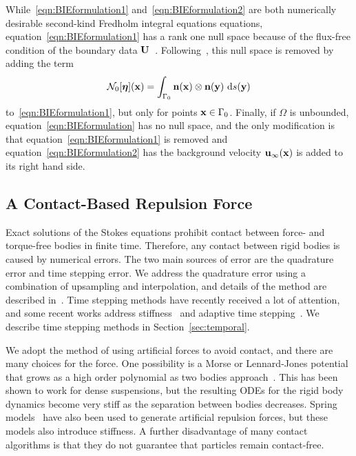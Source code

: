 \documentclass[preprint, 10pt]{elsarticle}
\begin{document}
While~\eqref{eqn:BIEformulation1} and~\eqref{eqn:BIEformulation2} are
both numerically desirable second-kind Fredholm integral equations
equations, equation~\eqref{eqn:BIEformulation1} has a rank one null
space because of the flux-free condition of the boundary data
${\mathbf{U}}$~\cite{Ladyzhenskaya1963}.  Following~\cite{Power1993}, this null
space is removed by adding the term 
\begin{align}
\label{eqn:N0_modification} 
  \mathcal{N}_0[{\boldsymbol\eta}]({\mathbf{x}}) = \int_{\Gamma_0} 
    {\mathbf{n}}({\mathbf{x}})\otimes{\mathbf{n}}({\mathbf{y}})~\text{d}s({\mathbf{y}})
\end{align}
to~\eqref{eqn:BIEformulation1}, but only for points ${\mathbf{x}} \in \Gamma_0$.
Finally, if $\Omega$ is unbounded, equation~\eqref{eqn:BIEformulation}
has no null space, and the only modification is that
equation~\eqref{eqn:BIEformulation1} is removed and
equation~\eqref{eqn:BIEformulation2} has the background velocity
${\mathbf{u}}_\infty({\mathbf{x}})$ is added to its right hand side.

\subsection{A Contact-Based Repulsion Force}
\label{sec:repulsion}
Exact solutions of the Stokes equations prohibit contact between force-
and torque-free bodies in finite time.  Therefore, any contact between
rigid bodies is caused by numerical errors.  The two main sources of
error are the quadrature error and time stepping error.  We address the
quadrature error using a combination of upsampling and interpolation,
and details of the method are described in~\cite{Quaife2014}.  Time
stepping methods have recently received a lot of attention, and some
recent works address stiffness~\cite{Quaife2014} and adaptive time
stepping~\cite{Kropinski1999, Quaife2015, Sorgentone2018}.  We describe
time stepping methods in Section~\ref{sec:temporal}.

We adopt the method of using artificial forces to avoid contact, and
there are many choices for the force. One possibility is a Morse or
Lennard-Jones potential that grows as a high order polynomial as two
bodies approach~\cite{Flormann2017, Liu2006}. This has been shown to
work for dense suspensions, but the resulting ODEs for the rigid body
dynamics become very stiff as the separation between bodies decreases.
Spring models~\cite{Tsubota2006, Zhao2013, Kabacogulu2017} have also
been used to generate artificial repulsion forces, but these models also
introduce stiffness. A further disadvantage of many contact algorithms
is that they do not guarantee that particles remain contact-free.
\end{document}
